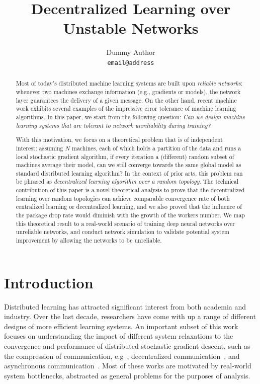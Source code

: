 \documentclass{article}
\title{Decentralized Learning over {\rc Unstable Networks}}
\author{
  Dummy Author \\
  \texttt{email@address} \\
}
\newcounter{ass_counter}
\newcounter{thm_counter}
\begin{document}

\maketitle

\begin{abstract}
Most of today's distributed machine learning systems
are built upon {\em reliable networks}: whenever
two machines exchange information (e.g., gradients
or models), the network layer guarantees the delivery
of a given message. On the other hand, recent machine
work exhibits several examples of
the impressive error tolerance of machine learning algorithms. In this paper, we start from the 
following question: {\em Can we design machine
learning systems that are tolerant to network unreliability during training?}

With this motivation, we focus on a theoretical
problem that is of independent interest: assuming
$N$ machines, each of which holds a partition
of the data and runs a local 
stochastic gradient algorithm, if every iteration
a (different) random subset of machines 
average their model, can we still converge towards the  
same global model as standard distributed 
learning algorithm? In the context of
prior arts, this problem can be phrased as
{\em decentralized learning algorithm over
a random topology}. The technical contribution of this
paper is a novel theoretical analysis to prove 
that 
the decentralized learning over random topologies can achieve comparable convergence rate of both centralized learning or decentralized learning, and we also proved that the influence of the package drop rate would diminish with the growth of the workers number.
We map this theoretical result to a real-world
scenario of training deep neural networks over
unreliable networks, and conduct network simulation
to validate potential system improvement by allowing
the networks to be unreliable.
\end{abstract}

\section{Introduction}

Distributed learning has attracted significant interest from both
academia and industry. Over the last decade, researchers have 
come with up a range of different designs of more efficient 
learning systems. An important subset of this work focuses on 
understanding the impact of different system relaxations to
the convergence and performance of distributed stochastic gradient
descent, such as the compression of communication, e.g~\cite{seide2016cntk},
decentralized communication~\cite{lian2017can,sirb2016consensus,lan2017communication}, and asynchronous
communication~\cite{lian2017asynchronous,zhang2013asynchronous,lian2015asynchronous}. 
Most of these works are motivated by real-world system bottlenecks, abstracted as general problems for the purposes of analysis.
\end{document}
